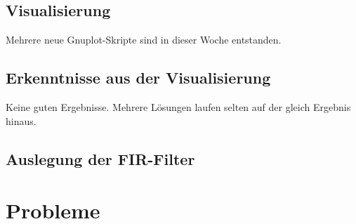 \documentclass[a4paper,12pt,fleqn]{article}
\begin{document}
\subsection{Visualisierung}
Mehrere neue Gnuplot-Skripte sind in dieser Woche entstanden.
%
%
\subsection{Erkenntnisse aus der Visualisierung}
%
Keine guten Ergebnisse. Mehrere Lösungen laufen selten auf der gleich Ergebnis hinaus.
%
\subsection{Auslegung der FIR-Filter}
%
%
\section{Probleme}
\label{Problems}
%
%


\newpage


\end{document}
